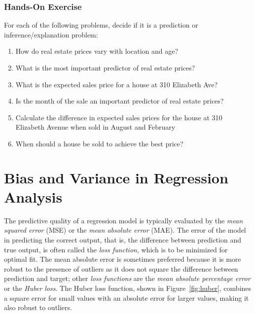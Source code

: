 \begin{tcolorbox}[colback=code]
\subsubsection*{Hands-On Exercise}

For each of the following problems, decide if it is a prediction or inference/explanation problem:
\begin{enumerate}
   \item How do real estate prices vary with location and age?
   \item What is the most important predictor of real estate prices?
   \item What is the expected sales price for a house at 310 Elizabeth Ave?
   \item Is the month of the sale an important predictor of real estate prices?
   \item Calculate the difference in expected sales prices for the house at 310 Elizabeth Avenue when sold in August and February
   \item When should a house be sold to achieve the best price?
\end{enumerate}
\end{tcolorbox}

\section{Bias and Variance in Regression Analysis}

The predictive quality of a regression model is typically evaluated by the \emph{mean squared error} (MSE) or the \emph{mean absolute error} (MAE). The error of the model in predicting the correct output, that is, the difference between prediction and true output, is often called the \emph{loss function}, which is to be minimized for optimal fit. The mean absolute error is sometimes preferred because it is more robust to the presence of outliers as it does not square the difference between prediction and target; other \emph{loss functions} are the \emph{mean absolute percentage error} or the \emph{Huber loss}. The Huber loss function, shown in Figure~\ref{fig:huber}, combines a square error for small values with an absolute error for larger values, making it also robust to outliers. 

